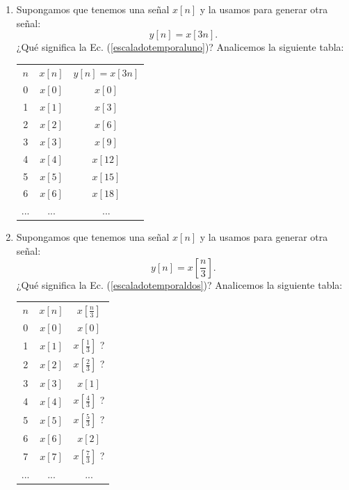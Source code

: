 \documentclass[11pt,a4paper,openany]{book}
\begin{document}
\begin{enumerate}
	\item Supongamos que tenemos una señal $x[n]$ y la usamos para
	generar otra señal:
	\begin{equation}
		y[n] = x[3n].
		\label{escaladotemporaluno}
	\end{equation}
	¿Qué significa la Ec. (\ref{escaladotemporaluno})?
	Analicemos la siguiente tabla:
	
	\begin{center}
		\begin{tabular}{ccc}
			$n$ & $x[n]$ & $y[n] = x[3n]$ \\
			0   &  $x[0]$ & $x[0]$ \\
			1   &  $x[1]$ & $x[3]$ \\
			2   &  $x[2]$ & $x[6]$ \\
			3   &  $x[3]$ & $x[9]$ \\
			4   &  $x[4]$ & $x[12]$ \\
			5   &  $x[5]$ & $x[15]$ \\
			6   &  $x[6]$ & $x[18]$ \\
			... &  ... & ...
		\end{tabular}
	\end{center}
	
	\item Supongamos que tenemos una señal $x[n]$ y la usamos para
	generar otra señal:
	\begin{equation}
		y[n] = x\left[\frac{n}{3}\right].
		\label{escaladotemporaldos}
	\end{equation}
	¿Qué significa la Ec. (\ref{escaladotemporaldos})?
	Analicemos la siguiente tabla:
	
	\begin{center}
		\begin{tabular}{ccc}
			$n$ & $x[n]$  & $x[\frac{n}{3}]$ \\
			0   &  $x[0]$ & $x[0]$ \\
			1   &  $x[1]$ & $x[\frac{1}{3}]$ ?\\
			2   &  $x[2]$ & $x[\frac{2}{3}]$ ?\\
			3   &  $x[3]$ & $x[1]$ \\
			4   &  $x[4]$ & $x[\frac{4}{3}]$ ?\\
			5   &  $x[5]$ & $x[\frac{5}{3}]$ ?\\
			6   &  $x[6]$ & $x[2]$ \\
			7   &  $x[7]$ & $x[\frac{7}{3}]$ ?\\
			... &  ... & ...
		\end{tabular}
	\end{center}
	

\end{enumerate}
\end{document}
